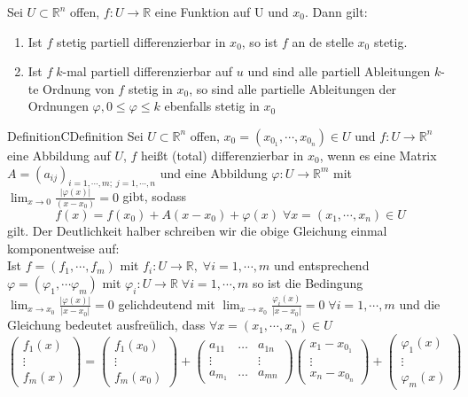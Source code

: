Sei $ U \subset \mathbb{R}^n  $ offen, $ f:U\to \mathbb{R}  $ eine Funktion auf U und $ x_0 $. Dann gilt:
\begin{enumerate}[label=\alph*)]
	\item Ist $ f $ stetig partiell differenzierbar in $ x_0 $, so ist $ f $ an de stelle $ x_0 $ stetig.
	\item Ist $ f \; k$-mal partiell differenzierbar auf $ u $ und sind alle partiell Ableitungen 
		$ k $-te Ordnung von $ f $ stetig in $ x_0 $, so sind alle partielle Ableitungen der Ordnungen 
		$ \varphi , 0 \leq \varphi \leq k $ ebenfalls stetig in $ x_0 $  
\end{enumerate}

\begin{ibox}[]{Definition}{CDefinition}
    Sei $ U \subset \mathbb{R}^n  $ offen, $ x_0 = \left( x_{0_{1}}, \cdots , x_{0_{n}} \right) \in  U $ und 
	$ f: U \to \mathbb{R}^{n}  $ eine Abbildung auf $ U $, $ f $ heißt (total) differenzierbar in $ x_0 $, wenn es eine 
	Matrix $ A = \left( a_{ij} \right)_{i = 1, \cdots,m ; \; j = 1, \cdots, n}  $ und eine Abbildung 
	$ \varphi : U \to \mathbb{R}^m   $ mit $ \lim_{x \to 0} \frac{|\varphi(x)|}{\left( x - x_0 \right) }  = 0 $ gibt,
	sodass 
	$$ f(x) = f(x_0) + A(x-x_0) + \varphi (x) \; \forall x = \left( x_1, \cdots, x_{n} \right) \in U $$
	gilt. Der Deutlichkeit halber schreiben wir die obige Gleichung einmal komponentweise auf:
	\\
	Ist $ f = \left( f_1, \cdots, f_{m} \right)  $ mit $ f_{i}: U \to \mathbb{R}, \; \forall i = 1, \cdots, m $
	und entsprechend $ \varphi = \left( \varphi_{1}, \cdots \varphi_{m} \right)  $ mit $ \varphi_{i}: U \to \mathbb{R} 
	\; \forall i = 1, \cdots, m$ so ist die Bedingung $ \lim_{x \to x_0} \frac{| \varphi (x)|}{|x - x_0|} = 0 $ 
	gelichdeutend mit $ \lim_{x \to x_0} \frac{\varphi_i (x)}{|x - x_0|} = 0 \; \forall i = 1, \cdots, m $ und 
	die Gleichung bedeutet ausfreülich, dass  $ \forall x = (x_1, \cdots, x_{n}) \in  U	 $ 	
	$$ 
		\begin{pmatrix}
			f_1(x) \\ \vdots \\ f_{m}(x) 
		\end{pmatrix} = \begin{pmatrix}
			f_1(x_{0}) \\ \vdots \\ f_{m}(x_0)  
		\end{pmatrix}+
		\begin{pmatrix}
			a_{11} &\dots &a_{1n}\\
			\vdots & & \vdots \\
			a_{m_1} & \dots	& a_{mn}
		\end{pmatrix}
		\begin{pmatrix}
			x_1 - x_{0_{1}}\\
			\vdots \\
			x_{n} - x_{0_{n}}
		\end{pmatrix} + 
		\begin{pmatrix}
			\varphi_1(x) \\
			\vdots \\
			\varphi_{m}(x)
		\end{pmatrix}
	$$
\end{ibox}
%
